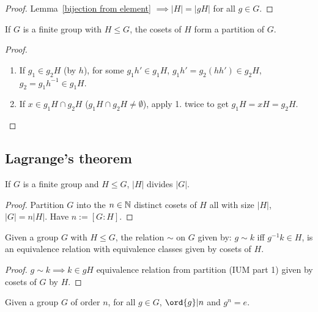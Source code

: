 \documentclass[../Year1.tex]{subfiles}
\begin{document}
\begin{proof}
    Lemma~\ref{bijection from element} $\implies |H|=|gH|$ for all $g\in G$.
\end{proof}

\begin{lemma}
    If $G$ is a finite group with $H\leq G$, the  cosets of $H$ form a partition of $G$.
\end{lemma}

\begin{proof}
    \begin{enumerate}
        \item If $g_1\in g_2H$ (by $h$), for some $g_1h'\in g_1H$, $g_1h'=g_2(hh')\in g_2H$, $g_2=g_1h^{-1}\in g_1H$.
        \item If $x\in g_1H\cap g_2H$ ($g_1H\cap g_2H\neq\emptyset$), apply 1. twice to get $g_1 H= xH = g_2 H$.
    \end{enumerate}
\end{proof}

\subsection{Lagrange's theorem}

\begin{theorem}
    If $G$ is a finite group and $H\leq G$, $|H|$ divides $|G|$.
\end{theorem}

\begin{proof}
    Partition $G$ into the $n\in\mathbb{N}$ distinct cosets of $H$ all with size $|H|$, $|G|=n|H|$. Have $n:=[G:H]$.
\end{proof}

\begin{corollary}
    Given a group $G$ with $H\leq G$, the relation $\sim$ on $G$ given by: $g\sim k$ iff $g^{-1}k\in H$, is an equivalence relation with equivalence classes given by cosets of $H$.
\end{corollary}

\begin{proof}
    $g\sim k\implies k\in gH$ equivalence relation from partition (IUM part 1) given by cosets of $G$ by $H$.
\end{proof}

\begin{corollary}\label{lagrange for elements}
    Given a group $G$ of order $n$, for all $g\in G$, $\ord{g}|n$ and $g^n=e$.
\end{corollary}
\end{document}
